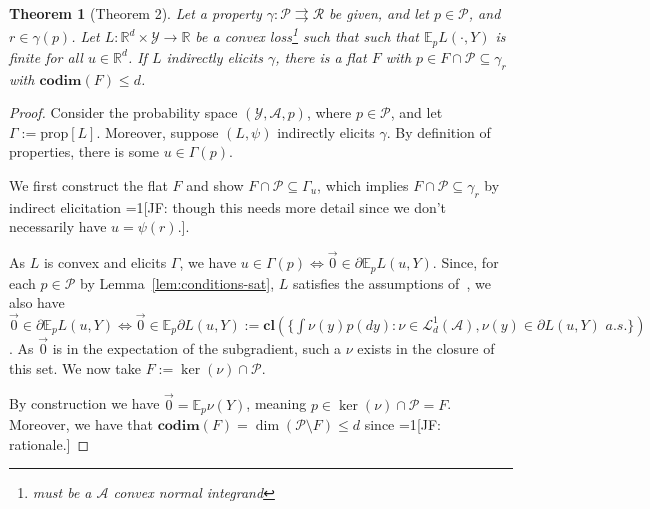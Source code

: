 \documentclass[12pt]{article}
\newcommand{\Comments}{1}
\newcommand{\mynote}[2]{\ifnum\Comments=1\textcolor{#1}{#2}\fi}
\newcommand{\jessie}[1]{\mynote{green!75!black}{[JF: #1]}}
\newcommand{\reals}{\mathbb{R}}
\newcommand{\toto}{\rightrightarrows}
\newcommand{\A}{\mathcal{A}}
\newcommand{\E}{\mathbb{E}}
\renewcommand{\L}{\mathcal{L}}
\renewcommand{\P}{\mathcal{P}}
\newcommand{\R}{\mathcal{R}}
\newcommand{\Y}{\mathcal{Y}}
\newcommand{\cl}{\mathbf{cl}}
\newcommand{\codim}{\mathbf{codim}}
\newcommand{\prop}[1]{\mathrm{prop}[#1]}
\newtheorem{theorem}{Theorem}
\begin{document}
\begin{theorem}[Theorem 2]
	Let a property $\gamma : \P \toto \R$ be given, and let $p \in \P$, and $r \in \gamma(p)$.
	Let $L : \reals^d \times \Y \to \reals$ be a convex loss\footnote{must be a $\A$ convex normal integrand} such that such that $\E_p L(\cdot,Y)$ is finite for all $u \in \reals^d$.
	If $L$ indirectly elicits $\gamma$, there is a flat $F$ with $p \in F \cap \P \subseteq \gamma_r$ with $\codim(F) \leq d$.
\end{theorem}
\begin{proof}
	Consider the probability space $(\Y, \A, p)$, where $p \in \P$, and let $\Gamma := \prop{L}$.
	Moreover, suppose $(L, \psi)$ indirectly elicits $\gamma$.
	By definition of properties, there is some $u \in \Gamma(p)$.
	
	We first construct the flat $F$ and show $F \cap \P \subseteq \Gamma_u$, which implies $F \cap \P \subseteq \gamma_r$ by indirect elicitation \jessie{though this needs more detail since we don't necessarily have $u = \psi(r)$.}. 
	
	As $L$ is convex and elicits $\Gamma$, we have $u \in \Gamma(p) \iff \vec 0 \in \partial \E_p L(u,Y)$.
	Since, for each $p \in \P$ by Lemma~\ref{lem:conditions-sat}, $L$ satisfies the assumptions of~\cite[Corollary 1]{rockafellar1982interchange}, we also have $\vec 0 \in \partial \E_p L(u,Y) \iff \vec 0 \in \E_p \partial L(u,Y) := \cl(\{\int \nu(y) p(dy) : \nu \in \L^1_d(\A), \nu(y) \in \partial L(u,Y)\,\, a.s.\})$.
	As $\vec 0$ is in the expectation of the subgradient, such a $\nu$ exists in the closure of this set.
	We now take $F := \ker(\nu) \cap \P$.
	
	By construction we have $\vec 0 = \E_p \nu(Y)$, meaning $p \in \ker(\nu) \cap \P = F$.
	Moreover, we have that $\codim(F) = \dim(\P \setminus F) \leq d$ since \jessie{rationale.}
\end{proof}
\end{document}
